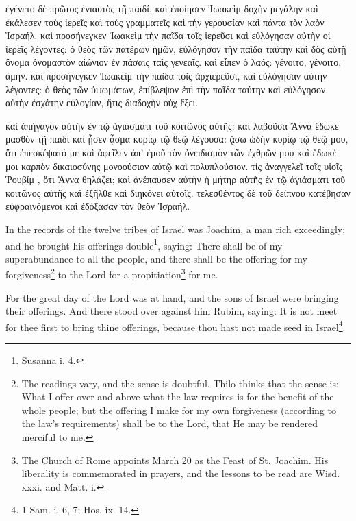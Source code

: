 \documentclass[12pt]{book} %
\begin{document}
\begin{pairs}
\begin{Leftside}
\pend\pstart
ἐγένετο δὲ πρῶτος ἐνιαυτὸς τῇ παιδί, καὶ ἐποίησεν Ἰωακεὶμ δοχὴν μεγάλην καὶ ἐκάλεσεν τοὺς ἱερεῖς καὶ τοὺς γραμματεῖς καὶ τὴν γερουσίαν καὶ πάντα τὸν λαὸν Ἰσραήλ. καὶ προσήνεγκεν Ἰωακεὶμ τὴν παῖδα τοῖς ἱερεῦσι καὶ εὐλόγησαν αὐτὴν οἱ ἱερεῖς λέγοντες: ὁ θεὸς τῶν πατέρων ἡμῶν, εὐλόγησον τὴν παῖδα ταύτην καὶ δὸς αὐτῇ ὄνομα ὀνομαστὸν αἰώνιον ἐν πάσαις ταῖς γενεαῖς. καὶ εἶπεν ὁ λαός: γένοιτο, γένοιτο, ἀμήν. καὶ προσήνεγκεν Ἰωακεὶμ τὴν παῖδα τοῖς ἀρχιερεῦσι, καὶ εὐλόγ\-ησαν αὐτὴν λέγοντες: ὁ θεὸς τῶν ὑψωμάτων, ἐπίβλεψον ἐπὶ τὴν παῖδα ταύτην καὶ εὐλόγησον αὐτὴν ἐσχάτην εὐλογίαν, ἥτις διαδοχὴν οὐχ ἕξει.

\pend\pstart
καὶ ἀπήγαγον αὐτὴν ἐν τῷ ἁγιάσματι τοῦ κοιτῶνος αὐτῆς: καὶ λαβοῦσα Ἄννα ἔδωκε μασθὸν τῇ παιδὶ καὶ ᾖσεν ᾆσμα κυρίῳ τῷ θεῷ λέγουσα: ᾄσω ὠδὴν κυρίῳ τῷ θεῷ μου, ὅτι ἐπεσκέψατό με καὶ ἀφεῖλεν ἀπ' ἐμοῦ τὸν ὀνειδισμὸν τῶν ἐχθρῶν μου καὶ ἔδωκέ μοι καρπὸν δικαιοσύνης μονοούσιον αὐτῷ καὶ πολυπλούσιον. τίς ἀναγγελεῖ τοῖς υἱοῖς Ῥουβίμ , ὅτι Ἄννα θηλάζει; καὶ ἀνέπαυσεν αὐτὴν ἡ μήτηρ αὐτῆς ἐν τῷ ἁγιάσματι τοῦ κοιτῶνος αὐτῆς καὶ ἐξῆλθε καὶ διηκόνει αὐτοῖς. τελεσ\-θέντος δὲ τοῦ δείπνου κατέβησαν εὐφραινόμενοι καὶ ἐδόξασαν τὸν θεὸν Ἰσραήλ.

\pend\pstart
{}

\pend\endnumbering\end{Leftside}
\begin{Rightside}\beginnumbering\pstart
{}

\pend\pstart
In the records of the twelve tribes of Israel was Joachim, a man rich exceedingly; and he brought his offerings double\footnote{Susanna i. 4.}, saying: There shall be of my superabundance to all the people, and there shall be the offering for my forgiveness\footnote{The readings vary, and the sense is doubtful. Thilo thinks that the sense is: What I offer over and above what the law requires is for the benefit of the whole people; but the offering I make for my own forgiveness (according to the law's requirements) shall be to the Lord, that He may be rendered merciful to me.} to the Lord for a propitiation\footnote{The Church of Rome appoints March 20 as the Feast of St. Joachim. His liberality is commemorated in prayers, and the lessons to be read are Wisd. xxxi. and Matt. i.} for me.

\pend\pstart
For the great day of the Lord was at hand, and the sons of Israel were bringing their offerings. And there stood over against him Rubim, saying: It is not meet for thee first to bring thine offerings, because thou hast not made seed in Israel\footnote{1 Sam. i. 6, 7; Hos. ix. 14.}.


\end{Rightside}
\end{pairs}
\end{document}
